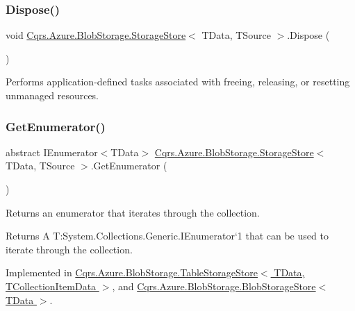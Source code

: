 \subsubsection{\texorpdfstring{Dispose()}{Dispose()}}
{\footnotesize\ttfamily void \hyperlink{classCqrs_1_1Azure_1_1BlobStorage_1_1StorageStore}{Cqrs.\+Azure.\+Blob\+Storage.\+Storage\+Store}$<$ T\+Data, T\+Source $>$.Dispose (\begin{DoxyParamCaption}{ }\end{DoxyParamCaption})}



Performs application-\/defined tasks associated with freeing, releasing, or resetting unmanaged resources. 

\mbox{\label{classCqrs_1_1Azure_1_1BlobStorage_1_1StorageStore_a2eb689ea51d586309b79d6cbac05b616}} 
\subsubsection{\texorpdfstring{Get\+Enumerator()}{GetEnumerator()}}
{\footnotesize\ttfamily abstract I\+Enumerator$<$T\+Data$>$ \hyperlink{classCqrs_1_1Azure_1_1BlobStorage_1_1StorageStore}{Cqrs.\+Azure.\+Blob\+Storage.\+Storage\+Store}$<$ T\+Data, T\+Source $>$.Get\+Enumerator (\begin{DoxyParamCaption}{ }\end{DoxyParamCaption})\hspace{0.3cm}{\ttfamily [pure virtual]}}



Returns an enumerator that iterates through the collection. 

\begin{DoxyReturn}{Returns}
A T\+:\+System.\+Collections.\+Generic.\+I\+Enumerator`1 that can be used to iterate through the collection. 
\end{DoxyReturn}


Implemented in \hyperlink{classCqrs_1_1Azure_1_1BlobStorage_1_1TableStorageStore_ac3e684b894e739f8936e537806952c49}{Cqrs.\+Azure.\+Blob\+Storage.\+Table\+Storage\+Store$<$ T\+Data, T\+Collection\+Item\+Data $>$}, and \hyperlink{classCqrs_1_1Azure_1_1BlobStorage_1_1BlobStorageStore_a7b106644bd8bfe5b1b5e5ef7bc279769}{Cqrs.\+Azure.\+Blob\+Storage.\+Blob\+Storage\+Store$<$ T\+Data $>$}.

